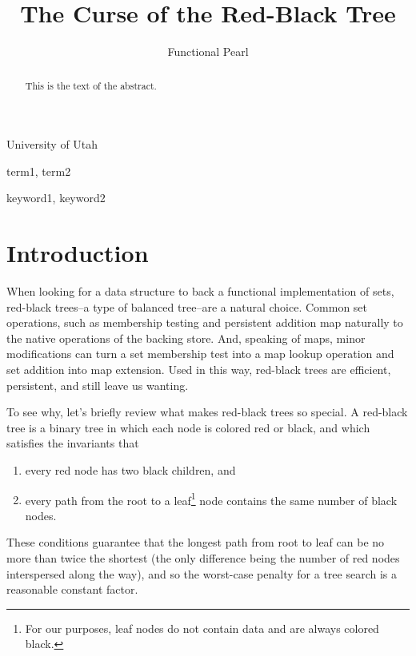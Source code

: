 \documentclass[preprint]{sigplanconf}
\begin{document}
\copyrightdata{[to be supplied]} 


\title{The Curse of the Red-Black Tree}
\subtitle{Functional Pearl}

           {University of Utah}

\maketitle

\begin{abstract}
This is the text of the abstract.
\end{abstract}


\terms
term1, term2

\keywords
keyword1, keyword2

\section{Introduction}

When looking for a data structure to back a functional implementation of sets, red-black trees--a type of balanced tree--are a natural choice. Common set operations, such as membership testing and persistent addition map naturally to the native operations of the backing store. And, speaking of maps, minor modifications can turn a set membership test into a map lookup operation and set addition into map extension. Used in this way, red-black trees are efficient, persistent, and still leave us wanting.

To see why, let's briefly review what makes red-black trees so special. A red-black tree is a binary tree in which each node is colored red or black, and which satisfies the invariants that
\begin{enumerate}
\item every red node has two black children, and
\item every path from the root to a leaf\footnote{For our purposes, leaf nodes do not contain data and are always colored black.} node contains the same number of black nodes.
\end{enumerate}
These conditions guarantee that the longest path from root to leaf can be no more than twice the shortest (the only difference being the number of red nodes interspersed along the way), and so the worst-case penalty for a tree search is a reasonable constant factor.
\end{document}
